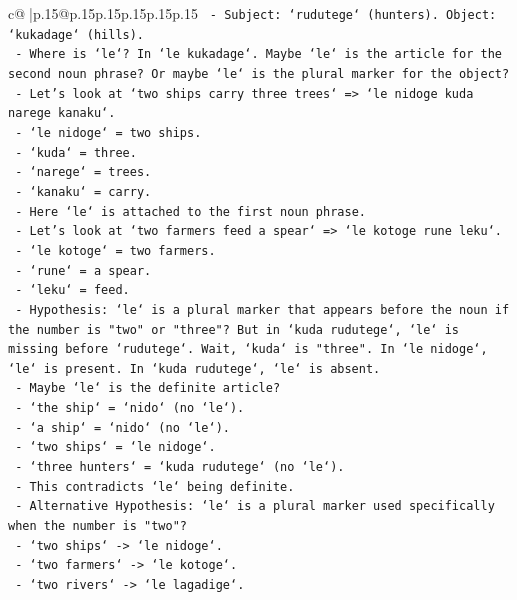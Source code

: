 \documentclass{article}
\begin{document}
{\begin{supertabular}{c@{$\;$}|p{.15\linewidth}@{}p{.15\linewidth}p{.15\linewidth}p{.15\linewidth}p{.15\linewidth}p{.15\linewidth}}
{{{\texttt{     {-} Subject: `rudutege` (hunters). Object: `kukadage` (hills).} \\
\texttt{     {-} Where is `le`? In `le kukadage`. Maybe `le` is the article for the second noun phrase? Or maybe `le` is the plural marker for the object?} \\
\texttt{     {-} Let's look at `two ships carry three trees` => `le nidoge kuda narege kanaku`.} \\
\texttt{       {-} `le nidoge` = two ships.} \\
\texttt{       {-} `kuda` = three.} \\
\texttt{       {-} `narege` = trees.} \\
\texttt{       {-} `kanaku` = carry.} \\
\texttt{       {-} Here `le` is attached to the first noun phrase.} \\
\texttt{     {-} Let's look at `two farmers feed a spear` => `le kotoge rune leku`.} \\
\texttt{       {-} `le kotoge` = two farmers.} \\
\texttt{       {-} `rune` = a spear.} \\
\texttt{       {-} `leku` = feed.} \\
\texttt{     {-} Hypothesis: `le` is a plural marker that appears before the noun if the number is "two" or "three"? But in `kuda rudutege`, `le` is missing before `rudutege`. Wait, `kuda` is "three". In `le nidoge`, `le` is present. In `kuda rudutege`, `le` is absent.} \\
\texttt{     {-} Maybe `le` is the definite article?} \\
\texttt{       {-} `the ship` = `nido` (no `le`).} \\
\texttt{       {-} `a ship` = `nido` (no `le`).} \\
\texttt{       {-} `two ships` = `le nidoge`.} \\
\texttt{       {-} `three hunters` = `kuda rudutege` (no `le`).} \\
\texttt{       {-} This contradicts `le` being definite.} \\
\texttt{     {-} Alternative Hypothesis: `le` is a plural marker used specifically when the number is "two"?} \\
\texttt{       {-} `two ships` {-}> `le nidoge`.} \\
\texttt{       {-} `two farmers` {-}> `le kotoge`.} \\
\texttt{       {-} `two rivers` {-}> `le lagadige`.} \\
}}}
\end{supertabular}}
\end{document}
